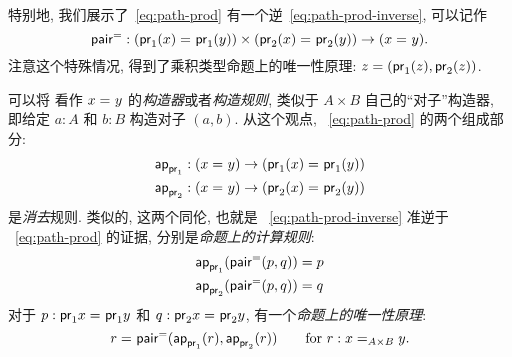 特别地, 我们展示了~\eqref{eq:path-prod} 有一个逆~\eqref{eq:path-prod-inverse}, 可以记作
\[
    \pairpath : (\id{\proj{1}(x)}{\proj{1}(y)}) \times (\id{\proj{2}(x)}{\proj{2}(y)}) \to (\id x y).
\]
注意这个特殊情况, 得到了乘积类型命题上的唯一性原理: $z = (\proj1(z),\proj2(z))$.

可以将 \pairpath 看作 $\id x y$ 的\emph{构造器}或者\emph{构造规则}, 类似于 $A\times B$ 自己的``对子''构造器, 即给定 $a:A$ 和 $b:B$ 构造对子 $(a,b)$.
从这个观点, ~\eqref{eq:path-prod} 的两个组成部分:
\begin{align*}
    \projpath{1} &: (\id{x}{y}) \to (\id{\proj{1}(x)}{\proj{1} (y)})\\
    \projpath{2} &: (\id{x}{y}) \to (\id{\proj{2}(x)}{\proj{2} (y)})
\end{align*}
是\emph{消去}规则.
类似的, 这两个同伦, 也就是 ~\eqref{eq:path-prod-inverse} 准逆于 ~\eqref{eq:path-prod} 的证据, 分别是\emph{命题上的计算规则}:
%
\begin{align*}
{\projpath{1}{(\pairpath(p, q)})}
    &= %
        {p} \\
    {\projpath{2}{(\pairpath(p,q)})}
    &= %
        {q}
\end{align*}
对于 $p:\id{\proj{1} x}{\proj{1} y}$ 和 $q:\id{\proj{2} x}{\proj{2} y}$, 有一个\emph{命题上的唯一性原理}:
%
\[
    \id{r}{\pairpath(\projpath{1} (r), \projpath{2} (r)) }
    \qquad\text{for } r : \id[A \times B] x y.
\]


